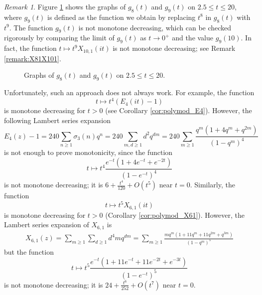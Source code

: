 \documentclass[10pt,reqno]{amsproc}
\newcommand{\1}{\mathds{1}}	%
\theoremstyle{definition}
\newtheorem{proposition}[theorem]{Proposition}
\theoremstyle{remark}
\newtheorem{remark}[theorem]{Remark}
\begin{document}
\begin{remark}
Figure \ref{fig:g8g9} shows the graphs of $g_8(t)$ and $g_9(t)$ on $2.5 \le t \le 20$, where $g_9(t)$ is defined as the function we obtain by replacing $t^8$ in $g_8(t)$ with $t^9$.
The function $g_9(t)$ is not monotone decreasing, which can be checked rigorously by comparing the limit of $g_9(t)$ as $t \to 0^+$ and the value $g_9(10)$.
In fact, the function $t \mapsto t^9 X_{10, 1}(it)$ is not monotone decreasing; see Remark \ref{remark:X81X101}.
\end{remark}

\begin{figure}[h]%
    \centering
    \subfloat[\centering $g_8(t)$]{{}}%
    \qquad
    \subfloat[\centering $g_9(t)$]{{}}%
    \caption{Graphs of $g_8(t)$ and $g_9(t)$ on $2.5 \le t \le 20$.}%
    \label{fig:g8g9}%
\end{figure}

Unfortunately, such an approach does not always work.
For example, the function
\[
t \mapsto t^4 (E_4(it) - 1)
\]
is monotone decreasing for $t > 0$ (see Corollary \ref{cor:polymod_E4}).
However, the following Lambert series expansion
\[
E_4(z) - 1 = 240 \sum_{n \ge 1} \sigma_3(n)q^n = 240 \sum_{m, d \ge 1} d^2 q^{dm} = 240 \sum_{m \ge 1} \frac{q^m(1 + 4q^m + q^{2m})}{(1 - q^m)^4}
\]
is not enough to prove monotonicity, since the function
\[
t \mapsto t^4 \frac{e^{-t}(1 + 4e^{-t} + e^{-2t})}{(1 - e^{-t})^4}
\]
is not monotone decreasing; it is $6 + \frac{t^4}{120} + O(t^5)$ near $t = 0$.
Similarly, the function
\[
t \mapsto t^5 X_{6, 1}(it)
\]
is monotone decreasing for $t > 0$ (Corollary \ref{cor:polymod_X61}).
However, the Lambert series expansion of $X_{6, 1}$ is 
\begin{align*}
    X_{6, 1}(z) = \sum_{m \ge 1} \sum_{d \ge 1} d^4 m q^{dm} = \sum_{m \ge 1} \frac{mq^m (1 + 11q^m + 11 q^{2m} + q^{3m})}{(1 - q^m)^5}
\end{align*}
but the function
\[
t \mapsto t^5 \frac{e^{-t} (1 + 11 e^{-t} + 11 e^{-2t} + e^{-3t})}{(1 - e^{-t})^5}
\]
is not monotone decreasing; it is $24 + \frac{t^6}{252} + O(t^7)$ near $t = 0$.
\end{document}
